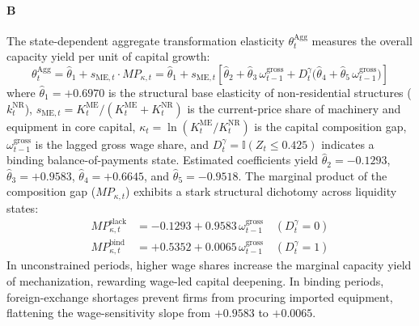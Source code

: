\paragraph{B} The state-dependent aggregate transformation elasticity $\theta_t^{\text{Agg}}$ measures the overall capacity yield per unit of capital growth:
\begin{equation}
	\theta_t^{\text{Agg}} = \hat{\theta}_1 + s_{\text{ME},t} \cdot MP_{\kappa,t}
	= \hat{\theta}_1 + s_{\text{ME},t} \left[ \hat{\theta}_2 + \hat{\theta}_3 \, \omega_{t-1}^{\text{gross}} + D_t^{\gamma} \bigl(\hat{\theta}_4 + \hat{\theta}_5 \, \omega_{t-1}^{\text{gross}}\bigr) \right]
	\label{eq:chile_theta_agg_def}
\end{equation}
where $\hat{\theta}_1 = +0.6970$ is the structural base elasticity of non-residential structures ($k_t^{\text{NR}}$), $s_{\text{ME},t} = K_t^{\text{ME}} / (K_t^{\text{ME}} + K_t^{\text{NR}})$ is the current-price share of machinery and equipment in core capital, $\kappa_t = \ln(K_t^{\text{ME}} / K_t^{\text{NR}})$ is the capital composition gap, $\omega_{t-1}^{\text{gross}}$ is the lagged gross wage share, and $D_t^{\gamma} = \mathbb{I}(Z_t \le 0.425)$ indicates a binding balance-of-payments state. Estimated coefficients yield $\hat{\theta}_2 = -0.1293$, $\hat{\theta}_3 = +0.9583$, $\hat{\theta}_4 = +0.6645$, and $\hat{\theta}_5 = -0.9518$. The marginal product of the composition gap ($MP_{\kappa,t}$) exhibits a stark structural dichotomy across liquidity states:
\begin{align}
	MP_{\kappa,t}^{\text{slack}} &= -0.1293 + 0.9583 \, \omega_{t-1}^{\text{gross}} \quad (D_t^{\gamma} = 0) \label{eq:mp_slack} \\
	MP_{\kappa,t}^{\text{bind}}  &= +0.5352 + 0.0065 \, \omega_{t-1}^{\text{gross}} \quad (D_t^{\gamma} = 1) \label{eq:mp_bind}
\end{align}
In unconstrained periods, higher wage shares increase the marginal capacity yield of mechanization, rewarding wage-led capital deepening. In binding periods, foreign-exchange shortages prevent firms from procuring imported equipment, flattening the wage-sensitivity slope from $+0.9583$ to $+0.0065$.

